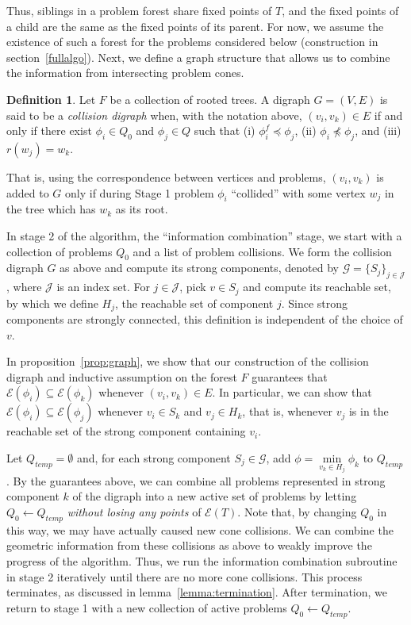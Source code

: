 \documentclass[11pt,reqno]{amsart}
\theoremstyle{definition}
\newtheorem{defn}[thm]{Definition}
\numberwithin{equation}{section}
\newcommand{\pre}{\phi}
\newcommand{\sub}{\subseteq}
\newcommand{\fix}{\mathcal{E}}
\newcommand{\peq}{\preceq}
\newcommand{\strongc}{\mathcal{G}}
\newcommand{\strongcomp}{S}
\newcommand{\acto}{Q_0}
\newcommand{\act}{Q}
\newcommand{\actt}{Q_{temp}}
\newcommand{\pref}{\pre^{f}}
\newcommand{\reach}{H}
\newcommand{\forest}{F}
\begin{document}
Thus, siblings in a problem forest share fixed points of $T$, and the fixed points of a child are the same as the fixed points of its parent. 
For now, we assume the existence of such a forest for the problems considered below (construction in section~\ref{fullalgo}). Next, we define a graph structure that allows us to combine the information from intersecting problem cones.

\begin{defn} \label{def:graph}
Let $\forest$ be a collection of rooted trees. A digraph $G = (V,E)$ is said to be a \emph{collision digraph} when, with the notation above, $(v_i,v_k) \in E$ if and only if there exist $\pre_i \in \acto$ and $\pre_j \in \act$ such that (i) $\pref_i \peq \pre_j$, (ii) $\pre_i \not \peq \pre_j$, and (iii) $r(w_j) = w_k$.
\end{defn}

That is, using the correspondence between vertices and problems, $(v_i,v_k)$ is added to $G$ only if during Stage 1 problem $\pre_i$ ``collided'' with some vertex $w_j$ in the tree which has $w_k$ as its root.  

In stage 2 of the algorithm, the ``information combination'' stage, we start with a collection of problems $\acto$ and a list of problem collisions. We form the collision digraph $G$ as above and compute its strong components, denoted by $\strongc = \{\strongcomp_j\}_{j\in \mathcal{J}}$, where $\mathcal{J}$ is an index set. 
For $j \in \mathcal{J}$, pick $v \in \strongcomp_j$ and compute its reachable set, by which we define $\reach_j$, the reachable set of component $j$. 
Since strong components are strongly connected, this definition is independent of the choice of $v$. 

In proposition~\ref{prop:graph}, we show that our construction of the collision digraph and inductive assumption on the forest $\forest$ guarantees that $\fix(\pre_i) \sub \fix(\pre_k)$ whenever $(v_i,v_k) \in E$. In particular, we can show that $\fix(\pre_i) \sub \fix(\pre_j)$ whenever $v_i \in \strongcomp_k$ and $v_j \in \reach_k$, that is, whenever $v_j$ is in the reachable set of the strong component containing $v_i$.

Let $\actt = \emptyset$ and, for each strong component $\strongcomp_j \in \strongc$, add $\pre = \min\limits_{v_k \in \reach_j} \pre_k$ to $\actt$.
By the guarantees above, we can combine all problems represented in strong component $k$ of the digraph into a new active set of problems by letting $\acto \leftarrow \actt$ \emph{without losing any points} of $\fix(T)$.
Note that, by changing $\acto$ in this way, we may have actually caused new cone collisions.
We can combine the geometric information from these collisions as above to weakly improve the progress of the algorithm.
Thus, we run the information combination subroutine in stage 2 iteratively until there are no more cone collisions.
This process terminates, as discussed in lemma~\ref{lemma:termination}.
After termination, we return to stage 1 with a new collection of active problems $\acto \leftarrow \actt$.
\end{document}
